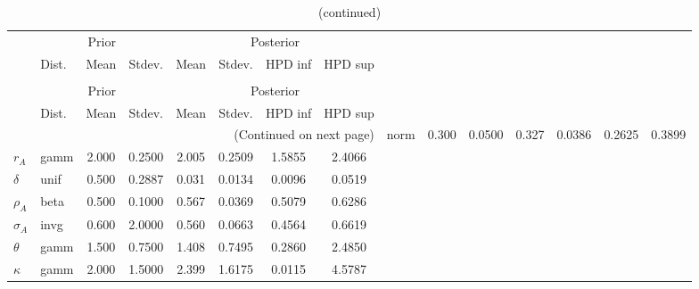 
\begin{center}
\begin{longtable}{llcccccc} 
\caption{Results from Metropolis-Hastings (parameters)}
 \label{Table:MHPosterior:1}\\
\toprule 
  & \multicolumn{3}{c}{Prior}  &  \multicolumn{4}{c}{Posterior} \\
  \cmidrule(r{.75em}){2-4} \cmidrule(r{.75em}){5-8}
  & Dist. & Mean  & Stdev. & Mean & Stdev. & HPD inf & HPD sup\\
\midrule \endfirsthead 
\caption{(continued)}\\\toprule 
  & \multicolumn{3}{c}{Prior}  &  \multicolumn{4}{c}{Posterior} \\
  \cmidrule(r{.75em}){2-4} \cmidrule(r{.75em}){5-8}
  & Dist. & Mean  & Stdev. & Mean & Stdev. & HPD inf & HPD sup\\
\midrule \endhead 
\bottomrule \multicolumn{8}{r}{(Continued on next page)} \endfoot 
\bottomrule \endlastfoot 
${\alpha}$ & norm &   0.300 & 0.0500 &   0.327& 0.0386 &  0.2625 &  0.3899 \\ 
${r_{A}}$ & gamm &   2.000 & 0.2500 &   2.005& 0.2509 &  1.5855 &  2.4066 \\ 
${\delta}$ & unif &   0.500 & 0.2887 &   0.031& 0.0134 &  0.0096 &  0.0519 \\ 
${\rho_A}$ & beta &   0.500 & 0.1000 &   0.567& 0.0369 &  0.5079 &  0.6286 \\ 
${\sigma_A}$ & invg &   0.600 & 2.0000 &   0.560& 0.0663 &  0.4564 &  0.6619 \\ 
${\theta}$ & gamm &   1.500 & 0.7500 &   1.408& 0.7495 &  0.2860 &  2.4850 \\ 
${\kappa}$ & gamm &   2.000 & 1.5000 &   2.399& 1.6175 &  0.0115 &  4.5787 \\ 
\end{longtable}
 \end{center}
